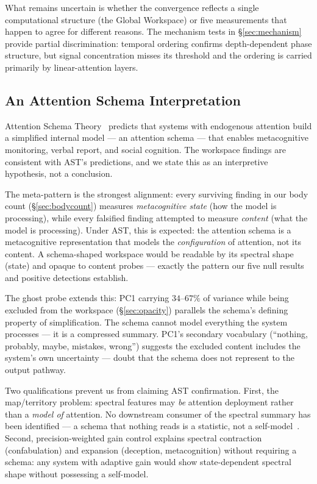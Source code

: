 \documentclass[11pt,a4paper]{article}
\begin{document}
What remains uncertain is whether the convergence reflects a single
computational structure (the Global Workspace) or five measurements
that happen to agree for different reasons. The mechanism tests in
\S\ref{sec:mechanism} provide partial discrimination: temporal
ordering confirms depth-dependent phase structure, but signal
concentration misses its threshold and the ordering is carried
primarily by linear-attention layers.

\subsection{An Attention Schema Interpretation}

Attention Schema Theory~\citep{graziano2015attention}
predicts that systems with endogenous attention build a simplified
internal model --- an attention schema --- that enables metacognitive
monitoring, verbal report, and social cognition. The workspace
findings are consistent with AST's predictions, and we state this as
an interpretive hypothesis, not a conclusion.

The meta-pattern is the strongest alignment: every surviving finding
in our body count (\S\ref{sec:bodycount}) measures
\emph{metacognitive state} (how the model is processing), while every
falsified finding attempted to measure \emph{content} (what the model
is processing). Under AST, this is expected: the attention schema is a
metacognitive representation that models the \emph{configuration} of
attention, not its content. A schema-shaped workspace would be
readable by its spectral shape (state) and opaque to content
probes --- exactly the pattern our five null results and positive
detections establish.

The ghost probe extends this: PC1 carrying $34$--$67\%$ of variance while
being excluded from the workspace (\S\ref{sec:opacity}) parallels
the schema's defining property of simplification. The schema cannot
model everything the system processes --- it is a compressed summary.
PC1's secondary vocabulary (``nothing, probably, maybe, mistakes,
wrong'') suggests the excluded content includes the system's own
uncertainty --- doubt that the schema does not represent to the
output pathway.

Two qualifications prevent us from claiming AST confirmation. First,
the map/territory problem: spectral features may \emph{be} attention
deployment rather than a \emph{model of} attention. No downstream
consumer of the spectral summary has been identified --- a schema
that nothing reads is a statistic, not a
self-model~\citep{graziano2015attention}. Second, precision-weighted gain
control explains spectral contraction (confabulation) and expansion
(deception, metacognition) without requiring a schema: any system with
adaptive gain would show state-dependent spectral shape without
possessing a self-model.
\end{document}
